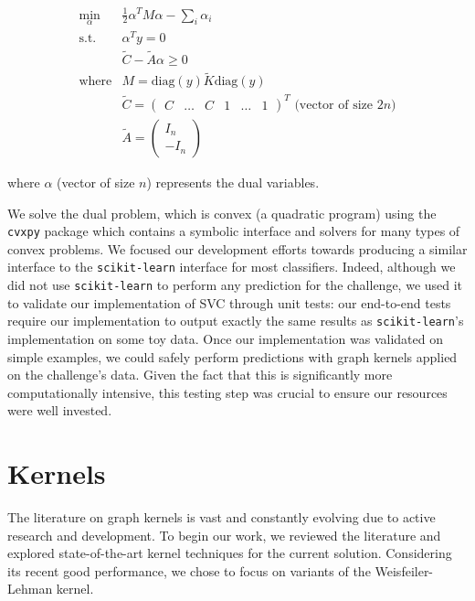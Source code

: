 \documentclass{IEEEtran}
\begin{document}
\begin{equation}
    \label{eq:dual_svc}
    \begin{split}
        \min_{\alpha} & \frac{1}{2} \alpha^T M \alpha - \sum_i \alpha_i\\
        \text{s.t.} & \alpha^T y = 0\\
                    & \tilde{C} - \tilde{A}\alpha \geq 0\\
        \text{where} & M = \text{diag}(y) \tilde{K} \text{diag}(y)\\
                     & \tilde{C} = \begin{pmatrix} C & \dots & C & 1 & \dots & 1 \end{pmatrix}^T \text{ (vector of size }2n \text{)}\\
                     & \tilde{A} = \begin{pmatrix} I_n \\ -I_n \end{pmatrix}
    \end{split}
\end{equation}

where $\alpha$ (vector of size $n$) represents the dual variables.

We solve the dual problem, which is convex (a quadratic program) using the \texttt{cvxpy} package which contains a symbolic interface and solvers for many types of convex problems.
We focused our development efforts towards producing a similar interface to the \texttt{scikit-learn} interface for most classifiers.
Indeed, although we did not use \texttt{scikit-learn} to perform any prediction for the challenge, we used it to validate our implementation of SVC through unit tests: our end-to-end tests require our implementation to output exactly the same results as \texttt{scikit-learn}'s implementation on some toy data.
Once our implementation was validated on simple examples, we could safely perform predictions with graph kernels applied on the challenge's data.
Given the fact that this is significantly more computationally intensive, this testing step was crucial to ensure our resources were well invested.

\section{Kernels}

The literature on graph kernels is vast and constantly evolving due to active research and development. To begin our work, we reviewed the literature and explored state-of-the-art kernel techniques for the current solution. Considering its recent good performance,
we chose to focus on variants of the Weisfeiler-Lehman kernel\cite{weisfeilerlehman1968}.
\end{document}
